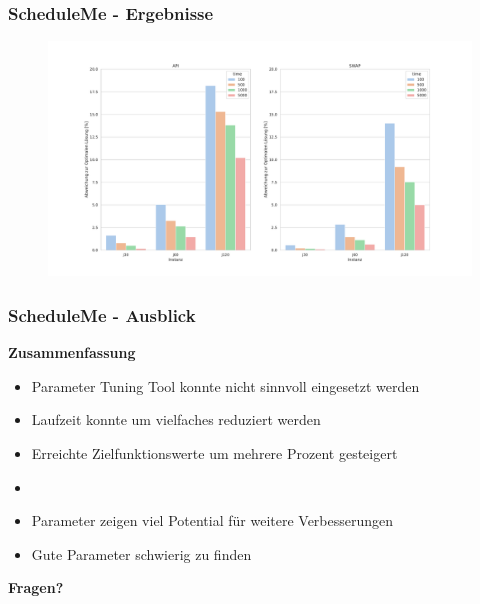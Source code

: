 \documentclass[aspectratio=169]{beamer}
\begin{document}
\begin{frame}
	\frametitle{ScheduleMe - Ergebnisse}
	\begin{figure}
		\centering
		\includegraphics[scale=0.29]{Figure_1.pdf}
	\end{figure}	
\end{frame}


\begin{frame}
\frametitle{ScheduleMe - Ausblick}
\textbf{Zusammenfassung}

\begin{itemize}
	\item Parameter Tuning Tool konnte nicht sinnvoll eingesetzt werden
	\item Laufzeit konnte um vielfaches reduziert werden
	\item Erreichte Zielfunktionswerte um mehrere Prozent gesteigert
	\item[]
	\item Parameter zeigen viel Potential für weitere Verbesserungen
	\item Gute Parameter schwierig zu finden \pause
\end{itemize}
\centering
\textbf{Fragen?}
\end{frame}
\end{document}
